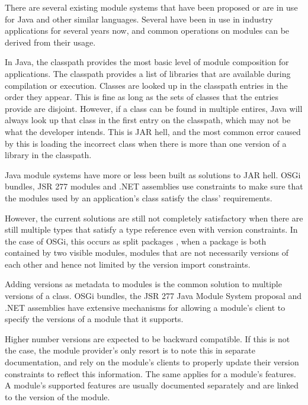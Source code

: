 There are several existing module systems that have been proposed or
are in use for Java and other similar languages. 
Several \cite{javajars, OSGi4, netassemblies} have been in use in industry 
applications for several years now, and common operations on modules
can be derived from their usage.


In Java, the classpath provides the most basic level of module composition
for applications. The classpath provides a list of libraries that are
available during compilation or execution. Classes are looked up in the 
classpath entries in the order they appear. This is fine as long as the sets 
of classes that the entries provide are disjoint. However, if a class can 
be found in multiple entires, Java will always look up that class in the 
first entry on the classpath, which may not be what the developer intends. 
This is JAR hell, and the most common error caused by this is loading 
the incorrect class when there is more than one version of a library in the classpath.

Java module systems have more or less been built as solutions to JAR hell. 
OSGi \cite{OSGi4} bundles, JSR 277 modules \cite{JSR277} and .NET assemblies \cite{netassemblies}
use constraints to make sure that the modules used by an application's class satisfy the 
class' requirements. 

However, the current solutions are still not completely satisfactory when there are still multiple
types that satisfy a type reference even with version constraints. In the case
of OSGi, this occurs as split packages \cite{iJAMComments}, when a package is both contained by
two visible modules, modules that are not necessarily versions of each other
and hence not limited by the version import constraints.

Adding versions as metadata to modules is the common solution to multiple
versions of a class. OSGi bundles, the JSR 277 Java Module System
proposal and .NET assemblies 
have extensive mechanisms for allowing a module's client to specify the
versions of a module that it supports.

Higher number versions are expected to be backward compatible. If this is not
the case, the module provider's only resort is to note this in separate documentation,
and rely on the module's clients to properly update their version constraints
to reflect this information. The same applies for a module's features. A module's
supported features are usually documented separately and are linked to the version
of the module.

